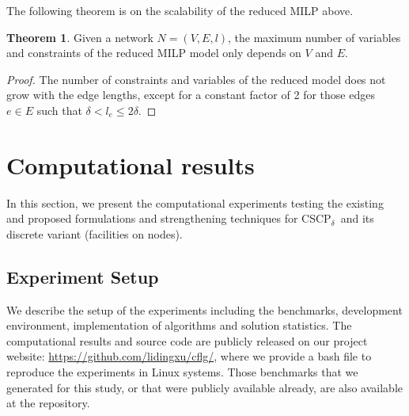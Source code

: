 \documentclass[review]{elsarticle}
\newcommand{\dlt}{{\delta}}
\newcommand{\problem}{CSCP$_\dlt$}
\theoremstyle{definition}
\newtheorem{theorem}{Theorem}[section]
\begin{document}

The following theorem is on the scalability of the reduced MILP above.
\begin{theorem}
Given a network %
$N=(V,E,l)$, the maximum number of variables and constraints of the reduced MILP model only depends on $V$ and $E$.%
\end{theorem}
\begin{proof}
The number of constraints and variables of the reduced model does not grow with the edge lengths, except for a constant factor of 2 for those edges $e\in E$ such that $\dlt < l_e \leq 2\dlt$.
\end{proof}

\section{Computational results}\label{sec:compu}

In this section, we present the computational experiments testing the existing and proposed formulations and strengthening techniques for  \problem \, and its discrete variant (facilities on nodes).

\subsection{Experiment Setup}
We describe the setup of the experiments including the benchmarks, development environment, implementation of algorithms and solution statistics. The  computational results and source code are publicly released on our project website: \href{https://github.com/lidingxu/cflg/}{https://github.com/lidingxu/cflg/}, where we provide a bash file to reproduce the experiments in Linux systems. Those benchmarks that we generated for this study, or that were publicly available already, are also available at the repository. %
\end{document}
